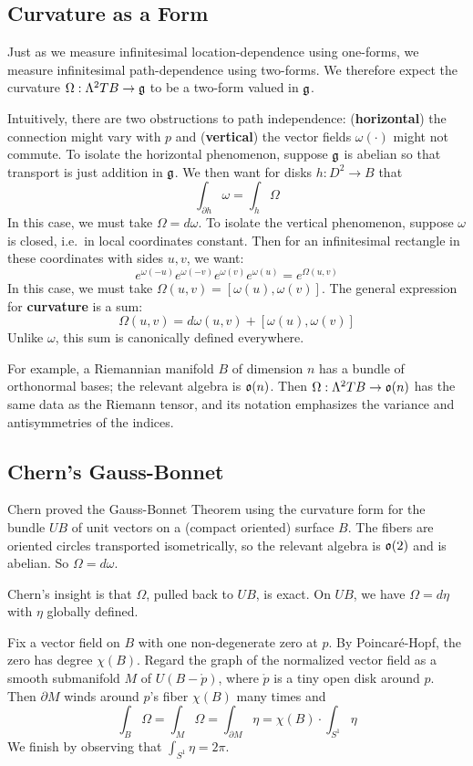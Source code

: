 \documentclass[twocolumn, 11pt]{article}
\newcommand{\gG}{\frak{g}}
\newcommand{\oO}{\frak{o}}
\theoremstyle{definition}
\newcommand{\msec}[1]{\subsection*{\color{mblu}\textsf{#1}}}
\begin{document}
\newpage
    \msec{Curvature as a Form}
        Just as we measure infinitesimal location-dependence using one-forms,
        we measure infinitesimal path-dependence using two-forms.  We therefore
        expect the curvature $\Omega : \Lambda^2 TB \to \gG$ to be a two-form 
        valued in $\gG$.

        Intuitively, there are two obstructions to path independence:
        (\textbf{horizontal}) the connection might vary with $p$ and  
        (\textbf{vertical}) the vector fields $\omega(\cdot)$ might not
        commute.
        To isolate the horizontal phenomenon, suppose $\gG$ is
        abelian so that transport is just addition in $\gG$.  We then
        want for disks $h: D^2 \to B$ that
        $$
            \int_{\partial h} \omega = \int_h \Omega
        $$
        In this case, we must take $\Omega = d\omega$.
        To isolate the vertical phenomenon, suppose $\omega$ is closed, i.e.\
        in local coordinates constant.  Then for an
        infinitesimal rectangle in these coordinates with sides $u, v$, we
        want:
        $$
            e^{\omega(-u)}e^{\omega(-v)}e^{\omega(v)}e^{\omega(u)}
            =
            e^{\Omega(u,v)}
        $$
        In this case, we must take $\Omega(u,v) = [\omega(u), \omega(v)]$.
        The general expression for \textbf{curvature} is a sum:
        $$
            \Omega(u,v) = d\omega(u,v) + [\omega(u), \omega(v)]
        $$
        Unlike $\omega$, this sum is canonically defined everywhere.

        For example, a Riemannian manifold $B$ of dimension $n$ has a bundle of
        orthonormal bases; the relevant algebra is $\oO(n)$.  Then
        $\Omega:\Lambda^2 TB \to \oO(n)$ has the same data as the Riemann
        tensor, and its notation emphasizes the variance and antisymmetries of
        the indices. 

    \newpage
    \msec{Chern's Gauss-Bonnet}
        Chern proved the Gauss-Bonnet Theorem using the curvature form for the
        bundle $UB$ of unit vectors on a (compact oriented) surface $B$.  The
        fibers are oriented circles transported isometrically, so the relevant
        algebra is $\oO(2)$ and is abelian.  So $\Omega = d\omega$.

        Chern's insight is that $\Omega$, pulled back to $UB$, is exact.  On 
        $UB$, we have $\Omega = d\eta$ with $\eta$ globally defined.

        Fix a vector field on $B$ with one non-degenerate zero at $p$.  By
        Poincar\'e-Hopf, the zero has degree $\chi(B)$.  Regard the graph of
        the normalized vector field as a smooth submanifold $M$ of $U(B -
        \mathring{p})$, where $\mathring{p}$ is a tiny open disk around $p$.
        Then $\partial M$ winds around $p$'s fiber $\chi(B)$ many times and
        $$
            \int_B \Omega = \int_M \Omega
                          = \int_{\partial M} \eta
                          = \chi(B) \cdot \int_{S^1} \eta
        $$
        We finish by observing that $\int_{S^1} \eta = 2\pi$.
\end{document}
